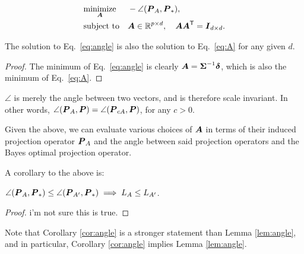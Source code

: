 \documentclass[10pt]{article}
\begin{document}
\begin{equation} \label{eq:angle}
\begin{aligned}
& \underset{\boldsymbol{A}}{\text{minimize}}
& & -\angle(\boldsymbol{P}_A,\boldsymbol{P}_*), 
\\ & \text{subject to} & & \boldsymbol{A} \in \mathbb{R}^{p \times d}, \quad \boldsymbol{A} \boldsymbol{A}^{\mathsf{T}} = \boldsymbol{I}_{d \times d}.
\end{aligned}
\end{equation}

\begin{lem} \label{lem:angle}
The solution to Eq.~\eqref{eq:angle} is also the solution to Eq.~\eqref{eq:A} for any given $d$.
\end{lem}

\begin{proof}
The minimum of Eq.~\eqref{eq:angle} is clearly $\boldsymbol{A}=\boldsymbol{\Sigma}^{-1} \boldsymbol{\delta}$, which is also the minimum of Eq.~\eqref{eq:A}.
\end{proof}

\begin{remark} 
$\angle$ is merely the angle between two vectors, and is therefore scale invariant.  In other words, $\angle(\boldsymbol{P}_A,\boldsymbol{P})=\angle(\boldsymbol{P}_{c A},\boldsymbol{P})$, for any $c > 0$.
\end{remark}

Given the above, we can evaluate various choices of $\boldsymbol{A}$ in terms of their induced projection operator $\boldsymbol{P}_A$ and the angle between said projection operators and the Bayes optimal projection operator.  


A corollary to the above is:
\begin{cor} \label{cor:angle}
$\angle(\boldsymbol{P}_A,\boldsymbol{P}_*) \leq \angle(\boldsymbol{P}_{A'},\boldsymbol{P}_*) \implies L_A \leq L_{A'}$.
\end{cor}

\begin{proof}
i'm not sure this is true.
\end{proof}
Note that Corollary \ref{cor:angle} is a stronger statement than Lemma \ref{lem:angle}, and in particular, Corollary \ref{cor:angle} implies Lemma \ref{lem:angle}.


\end{document}
